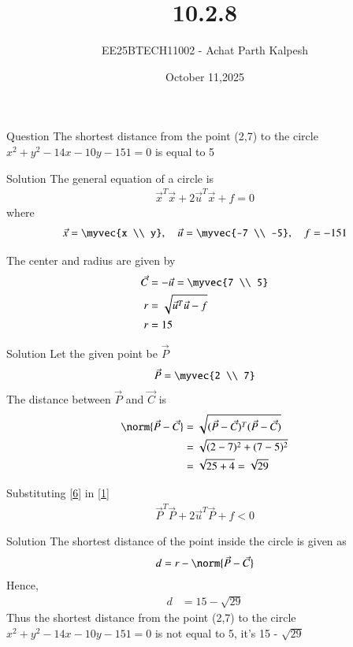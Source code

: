 \documentclass{beamer}
\title %
{10.2.8}
\date{October 11,2025}
\author %
{EE25BTECH11002 - Achat Parth Kalpesh}
\begin{document}
\frame{\titlepage}

\begin{frame}{Question}
The shortest distance from the point (2,7) to the circle $x^2+y^2- 14x-10y-151=0$ is equal to 5 
\end{frame}

\begin{frame}{Solution}
The general equation of a circle is
\begin{align}
\label{1}
\vec{x}^T\vec{x} + 2\vec{u}^T\vec{x} + f = 0
\end{align}
where
\begin{align}
\vec{x} = \myvec{x \\ y},  \quad \vec{u} = \myvec{-7 \\ -5}, \quad f = -151
\end{align}

The center and radius are given by
\begin{align}
\vec{C} &= -\vec{u} = \myvec{7 \\ 5} \\
r &= \sqrt{\vec{u}^T\vec{u} - f}\\
r &= 15
\end{align}
\end{frame}



\begin{frame}{Solution}
Let the given point be $\vec{P}$
\begin{align}
\label{6}
\vec{P} = \myvec{2 \\ 7}
\end{align}
The distance between $\vec{P}$ and $\vec{C}$ is
\begin{align}
\norm{\vec{P} - \vec{C}} &= \sqrt{(\vec{P} - \vec{C})^T(\vec{P} - \vec{C})} \\
&= \sqrt{(2-7)^2 + (7-5)^2} \\
&= \sqrt{25 + 4} = \sqrt{29}
\end{align}

Substituting \eqref{6} in \eqref{1}\\
\begin{align}
    \vec{P}^T\vec{P} + 2\vec{u}^T\vec{P} + f < 0
\end{align}
\end{frame}

\begin{frame}{Solution}
The shortest distance of the point inside the circle is given as
\begin{align}
d = r - \norm{\vec{P} - \vec{C}}
\end{align}
Hence,
\begin{align}
d &= 15 - \sqrt{29}
\end{align}
Thus the shortest distance from the point (2,7) to the circle $x^2+y^2- 14x-10y-151=0$ is not equal to 5, it's 15 - $\sqrt{29}$
\end{frame}
\end{document}
